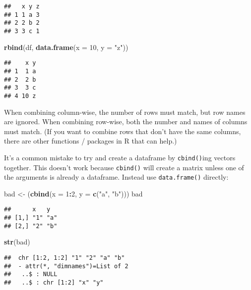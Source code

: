 \documentclass[
]{book}
\newenvironment{Shaded}{\begin{snugshade}}{\end{snugshade}}
\newcommand{\DataTypeTok}[1]{\textcolor[rgb]{0.13,0.29,0.53}{#1}}
\newcommand{\DecValTok}[1]{\textcolor[rgb]{0.00,0.00,0.81}{#1}}
\newcommand{\KeywordTok}[1]{\textcolor[rgb]{0.13,0.29,0.53}{\textbf{#1}}}
\newcommand{\NormalTok}[1]{#1}
\newcommand{\OperatorTok}[1]{\textcolor[rgb]{0.81,0.36,0.00}{\textbf{#1}}}
\newcommand{\StringTok}[1]{\textcolor[rgb]{0.31,0.60,0.02}{#1}}
\begin{document}
\begin{verbatim}
##   x y z
## 1 1 a 3
## 2 2 b 2
## 3 3 c 1
\end{verbatim}

\begin{Shaded}
\begin{Highlighting}[]
\KeywordTok{rbind}\NormalTok{(df, }\KeywordTok{data.frame}\NormalTok{(}\DataTypeTok{x =} \DecValTok{10}\NormalTok{, }\DataTypeTok{y =} \StringTok{"z"}\NormalTok{))}
\end{Highlighting}
\end{Shaded}

\begin{verbatim}
##    x y
## 1  1 a
## 2  2 b
## 3  3 c
## 4 10 z
\end{verbatim}

When combining column-wise, the number of rows must match, but row names are ignored. When combining row-wise, both the number and names of columns must match. (If you want to combine rows that don't have the same columns, there are other functions / packages in R that can help.)

It's a common mistake to try and create a dataframe by \texttt{cbind()}ing vectors together. This doesn't work because \texttt{cbind()} will create a matrix unless one of the arguments is already a dataframe. Instead use \texttt{data.frame()} directly:

\begin{Shaded}
\begin{Highlighting}[]
\NormalTok{bad \textless{}{-}}\StringTok{ }\NormalTok{(}\KeywordTok{cbind}\NormalTok{(}\DataTypeTok{x =} \DecValTok{1}\OperatorTok{:}\DecValTok{2}\NormalTok{, }\DataTypeTok{y =} \KeywordTok{c}\NormalTok{(}\StringTok{"a"}\NormalTok{, }\StringTok{"b"}\NormalTok{)))}
\NormalTok{bad}
\end{Highlighting}
\end{Shaded}

\begin{verbatim}
##      x   y  
## [1,] "1" "a"
## [2,] "2" "b"
\end{verbatim}

\begin{Shaded}
\begin{Highlighting}[]
\KeywordTok{str}\NormalTok{(bad)}
\end{Highlighting}
\end{Shaded}

\begin{verbatim}
##  chr [1:2, 1:2] "1" "2" "a" "b"
##  - attr(*, "dimnames")=List of 2
##   ..$ : NULL
##   ..$ : chr [1:2] "x" "y"
\end{verbatim}
\end{document}
